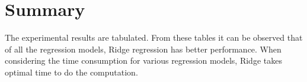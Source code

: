 \section{Summary}
The experimental results are tabulated. From these tables it can be observed that of all the regression models, Ridge regression has better performance. When considering the time consumption for various regression models, Ridge takes optimal time to do the computation. 